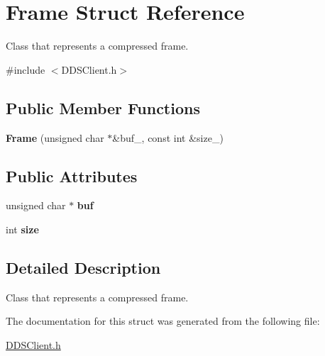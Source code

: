 \hypertarget{struct_frame}{\section{Frame Struct Reference}
\label{struct_frame}
}


Class that represents a compressed frame.  




{\ttfamily \#include $<$D\+D\+S\+Client.\+h$>$}

\subsection*{Public Member Functions}
\begin{DoxyCompactItemize}
\item 
\hypertarget{struct_frame_a1ed2cbc5161a5526db30b37c763bf7e6}{{\bfseries Frame} (unsigned char $\ast$\&buf\+\_\+, const int \&size\+\_\+)}\label{struct_frame_a1ed2cbc5161a5526db30b37c763bf7e6}

\end{DoxyCompactItemize}
\subsection*{Public Attributes}
\begin{DoxyCompactItemize}
\item 
\hypertarget{struct_frame_a5277685fd79d2a95cbfe4be6bd1d136b}{unsigned char $\ast$ {\bfseries buf}}\label{struct_frame_a5277685fd79d2a95cbfe4be6bd1d136b}

\item 
\hypertarget{struct_frame_a2c5a66a81df52f947008598cb2a0c281}{int {\bfseries size}}\label{struct_frame_a2c5a66a81df52f947008598cb2a0c281}

\end{DoxyCompactItemize}


\subsection{Detailed Description}
Class that represents a compressed frame. 

The documentation for this struct was generated from the following file\+:\begin{DoxyCompactItemize}
\item 
\hyperlink{_d_d_s_client_8h}{D\+D\+S\+Client.\+h}\end{DoxyCompactItemize}
